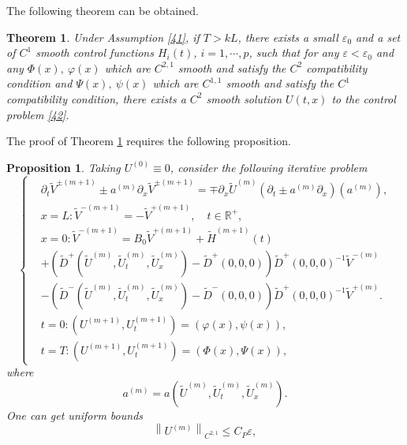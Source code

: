 \documentclass[a4paper,reqno,11pt]{amsart}
\numberwithin{equation}{section} %
\newtheorem{prop}[lem]{Proposition}
\newtheorem{thm}{Theorem}
\begin{document}
The following theorem can be obtained.
\begin{thm} \label{thm:main}
	Under Assumption \eqref{41}, if $T > kL$, there exists a small $\varepsilon _0$ and a set of $C^1$ smooth control functions $H_i(t)$, $i=1,\cdots ,p$, such that for any $\varepsilon < \varepsilon _0 $ and any $\varPhi (x),\ \varphi  (x)$ which are $C^{2,1}$ smooth and satisfy the $C^2$ compatibility condition and $\varPsi (x),\ \psi (x)$ which are $C^{1,1}$ smooth and satisfy the $C^1$ compatibility condition, there exists a $C^2$ smooth solution $U(t,x)$ to the control problem \eqref{42}.
\end{thm}

The proof of Theorem \ref{thm:main} requires the following proposition.
\begin{prop}\label{prop:main}
	Taking $U^{(0)}\equiv 0$, consider the following iterative problem
	\begin{equation}
		\begin{cases}
		& \partial_t \widetilde{V}^{ \pm(m+1)} \pm a^{(m)} \partial_x \widetilde{V}^{ \pm(m+1)}=\mp \partial_x \widetilde{U}^{(m)}\left(\partial_t \pm a^{(m)} \partial_x\right)\left(a^{(m)}\right), \\
		& x=L: \widetilde{V}^{-(m+1)}=-\widetilde{V}^{+(m+1)}, \quad t \in \mathbb{R}^{+}, \\
		& x=0: \widetilde{V}^{-(m+1)}=B_0 \widetilde{V}^{+(m+1)}+\widetilde{H}^{(m+1)}(t) \\
		& +\left(\widetilde{D}^{+}\left(\widetilde{U}^{(m)}, \widetilde{U}_t^{(m)}, \widetilde{U}_x^{(m)}\right)-\widetilde{D}^{+}(0,0,0)\right) \widetilde{D}^{+}(0,0,0)^{-1} \widetilde{V}^{-(m)} \\
		& -\left(\widetilde{D}^{-}\left(\widetilde{U}^{(m)}, \widetilde{U}_t^{(m)}, \widetilde{U}_x^{(m)}\right)-\widetilde{D}^{-}(0,0,0)\right) \widetilde{D}^{+}(0,0,0)^{-1} \widetilde{V}^{+(m)}.\\
		& t=0:\left( U^{(m+1)},U^{(m+1)}_t \right) =\left( \varphi  \left( x \right) ,\psi \left( x \right) \right)  ,\\
		& t=T:\left( U^{(m+1)},U^{(m+1)}_t \right) =\left( \varPhi   \left( x \right) ,\varPsi  \left( x \right) \right) ,
	\end{cases}	
	\end{equation}
where
$$
a^{(m)}=a\left(\widetilde{U}^{(m)}, \widetilde{U}_t^{(m)}, \widetilde{U}_x^{(m)}\right) .
$$
One can get uniform bounds
\begin{equation}\label{bounds u}
 \left\lVert U^{\left( m \right)}\right\rVert  _{C^{2,1}}\leq C_P\varepsilon ,

\end{equation}
\end{prop}
\end{document}
